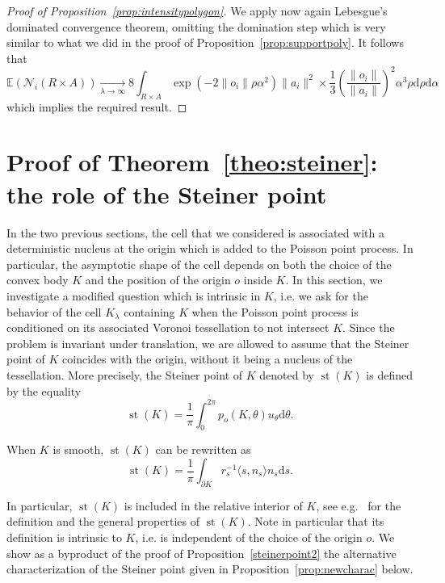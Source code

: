 \documentclass[AHL,Unicode,longabstracts,published]{cedram}
\newcommand{\cN}{\mathcal{N}}
\newcommand{\dd}{\mathrm{d}}
\newcommand{\E}{\mathbb{E}}
\DeclareMathOperator{\st}{st}
\newcommand{\noi}{\noindent}
\begin{document}
\begin{proof}[{Proof of Proposition~\ref{prop:intensitypolygon}}]
We apply now again Lebesgue's dominated convergence theorem, omitting the domination step which is very similar to what we did in the proof of Proposition~\ref{prop:supportpoly}. It follows that
\[
\E(\cN_i(R\times A)) \underset{\lambda\to\infty}{\longrightarrow} 8\int_{R\times A} \exp\left(-2\|o_i\|\rho\alpha^2\right)\|a_i\|^2\times\frac1{3}\left(\frac{\|o_i\|}{\|a_i\|}\right)^2\alpha^3 \rho\dd\rho\dd\alpha
\]
which implies the required result.
\end{proof}



\section{Proof of Theorem~\ref{theo:steiner}: the role of the Steiner point}\label{sec:steiner}

In the two previous sections, the cell that we considered is associated with a deterministic nucleus at the origin which is added to the Poisson point process. In particular, the asymptotic shape of the cell depends on both the choice of the convex body $K$ and the position of the origin $o$ inside $K$. In this section, we investigate a modified question which is intrinsic in $K$, i.e. we ask for the behavior of the cell ${K}_{\lambda}$ containing $K$ when the Poisson point process is conditioned on its associated Voronoi tessellation to not intersect $K$. Since the problem is invariant under translation, we are allowed to assume that the Steiner point of $K$ coincides with the origin, without it being a nucleus of the tessellation. More precisely, the Steiner point of $K$ denoted by $\st(K)$ is defined by the equality
\begin{equation*}
\st (K)=\frac{1}{\pi}\int_0^{2\pi} p_o(K,\theta)u_\theta\dd\theta.
\end{equation*}

When $K$ is smooth, $\st (K)$ can be rewritten as
\begin{equation*}
\st (K)=\frac{1}{\pi}\int_{\partial K}r_s^{-1}\langle s,n_s\rangle n_s\dd s.
\end{equation*}

In particular, $\st (K)$ is included in the relative interior of $K$, see e.g.~\cite[Section~1.7]{Schneider} for the definition and the general properties of $\st (K)$. Note in particular that its definition is intrinsic to $K$, i.e. is independent of the choice of the origin $o$. We show as a byproduct of the proof of Proposition~\ref{steinerpoint2} the alternative characterization of the Steiner point given in Proposition~\ref{prop:newcharac} below.
\end{document}
